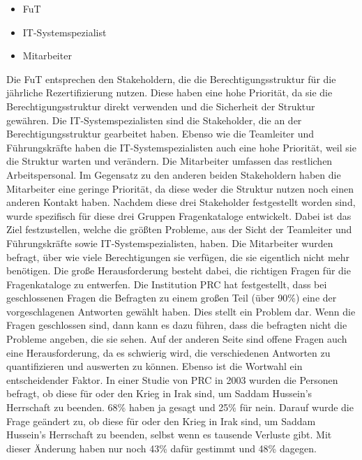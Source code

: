 \begin{itemize}
	\item \ac{FuT}
	\item IT-Systemspezialist
	\item Mitarbeiter
\end{itemize}
Die \ac{FuT} entsprechen den Stakeholdern, die die Berechtigungsstruktur für die jährliche Rezertifizierung nutzen.
Diese haben eine hohe Priorität, da sie die Berechtigungsstruktur direkt verwenden und die Sicherheit der Struktur gewähren.
\newline
Die IT-Systemspezialisten sind die Stakeholder, die an der Berechtigungsstruktur gearbeitet haben.
Ebenso wie die Teamleiter und Führungskräfte haben die IT-Systemspezialisten auch eine hohe Priorität, weil sie die Struktur warten und verändern.
\newline
Die Mitarbeiter umfassen das restlichen Arbeitspersonal.
Im Gegensatz zu den anderen beiden Stakeholdern haben die Mitarbeiter eine geringe Priorität, da diese weder die Struktur nutzen noch einen anderen Kontakt haben.
\newline
\newline
Nachdem diese drei Stakeholder festgestellt worden sind, wurde spezifisch für diese drei Gruppen Fragenkataloge entwickelt.
Dabei ist das Ziel festzustellen, welche die größten Probleme, aus der Sicht der Teamleiter und Führungskräfte sowie IT-Systemspezialisten, haben.
Die Mitarbeiter wurden befragt, über wie viele Berechtigungen sie verfügen, die sie eigentlich nicht mehr benötigen.
Die große Herausforderung besteht dabei, die richtigen Fragen für die Fragenkataloge zu entwerfen.
Die Institution \ac{PRC} hat festgestellt, dass bei geschlossenen Fragen die Befragten zu einem großen Teil (über 90\%) eine der vorgeschlagenen Antworten gewählt haben. \cite{Survey}
Dies stellt ein Problem dar.
Wenn die Fragen geschlossen sind, dann kann es dazu führen, dass die befragten nicht die Probleme angeben, die sie sehen.
Auf der anderen Seite sind offene Fragen auch eine Herausforderung, da es schwierig wird, die verschiedenen Antworten zu quantifizieren und auswerten zu können.
Ebenso ist die Wortwahl ein entscheidender Faktor.
In einer Studie von \ac{PRC} in 2003 wurden die Personen befragt, ob diese für oder den Krieg in Irak sind, um Saddam Hussein's Herrschaft zu beenden.
68\% haben ja gesagt und 25\% für nein.
Darauf wurde die Frage geändert zu, ob diese für oder den Krieg in Irak sind, um Saddam Hussein's Herrschaft zu beenden, selbst wenn es tausende Verluste gibt.
Mit dieser Änderung haben nur noch 43\% dafür gestimmt und 48\% dagegen. \cite{Survey}
